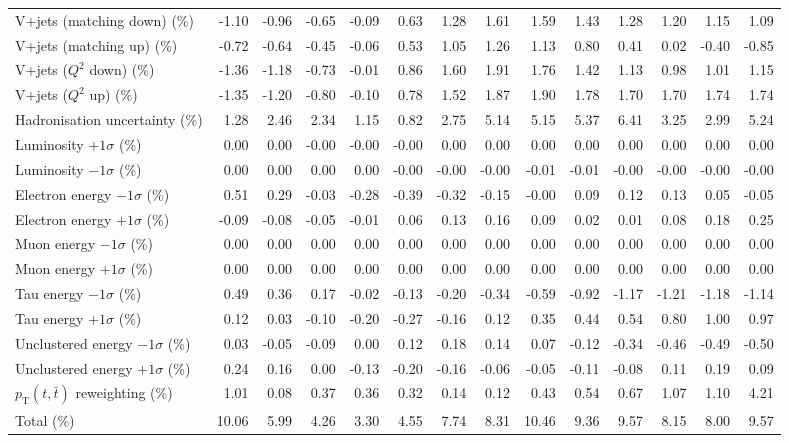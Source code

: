 \begin{table}[htbp]
{\begin{tabular}{lrrrrrrrrrrrrr}
V+jets (matching down) (\%) & -1.10 & -0.96 & -0.65 & -0.09 & 0.63 & 1.28 & 1.61 & 1.59 & 1.43 & 1.28 & 1.20 & 1.15 & 1.09 \\ 
V+jets (matching up) (\%) & -0.72 & -0.64 & -0.45 & -0.06 & 0.53 & 1.05 & 1.26 & 1.13 & 0.80 & 0.41 & 0.02 & -0.40 & -0.85 \\ 
V+jets ($Q^{2}$ down) (\%) & -1.36 & -1.18 & -0.73 & -0.01 & 0.86 & 1.60 & 1.91 & 1.76 & 1.42 & 1.13 & 0.98 & 1.01 & 1.15 \\ 
V+jets ($Q^{2}$ up) (\%) & -1.35 & -1.20 & -0.80 & -0.10 & 0.78 & 1.52 & 1.87 & 1.90 & 1.78 & 1.70 & 1.70 & 1.74 & 1.74 \\ 
Hadronisation uncertainty (\%) & 1.28 & 2.46 & 2.34 & 1.15 & 0.82 & 2.75 & 5.14 & 5.15 & 5.37 & 6.41 & 3.25 & 2.99 & 5.24 \\ 
Luminosity $+1\sigma$ (\%) & 0.00 & 0.00 & -0.00 & -0.00 & -0.00 & 0.00 & 0.00 & 0.00 & 0.00 & 0.00 & 0.00 & 0.00 & 0.00 \\ 
Luminosity $-1\sigma$ (\%) & 0.00 & 0.00 & 0.00 & 0.00 & -0.00 & -0.00 & -0.00 & -0.01 & -0.01 & -0.00 & -0.00 & -0.00 & -0.00 \\ 
Electron energy $-1\sigma$ (\%) & 0.51 & 0.29 & -0.03 & -0.28 & -0.39 & -0.32 & -0.15 & -0.00 & 0.09 & 0.12 & 0.13 & 0.05 & -0.05 \\ 
Electron energy $+1\sigma$ (\%) & -0.09 & -0.08 & -0.05 & -0.01 & 0.06 & 0.13 & 0.16 & 0.09 & 0.02 & 0.01 & 0.08 & 0.18 & 0.25 \\ 
Muon energy $-1\sigma$ (\%) & 0.00 & 0.00 & 0.00 & 0.00 & 0.00 & 0.00 & 0.00 & 0.00 & 0.00 & 0.00 & 0.00 & 0.00 & 0.00 \\ 
Muon energy $+1\sigma$ (\%) & 0.00 & 0.00 & 0.00 & 0.00 & 0.00 & 0.00 & 0.00 & 0.00 & 0.00 & 0.00 & 0.00 & 0.00 & 0.00 \\ 
Tau energy $-1\sigma$ (\%) & 0.49 & 0.36 & 0.17 & -0.02 & -0.13 & -0.20 & -0.34 & -0.59 & -0.92 & -1.17 & -1.21 & -1.18 & -1.14 \\ 
Tau energy $+1\sigma$ (\%) & 0.12 & 0.03 & -0.10 & -0.20 & -0.27 & -0.16 & 0.12 & 0.35 & 0.44 & 0.54 & 0.80 & 1.00 & 0.97 \\ 
Unclustered energy $-1\sigma$ (\%) & 0.03 & -0.05 & -0.09 & 0.00 & 0.12 & 0.18 & 0.14 & 0.07 & -0.12 & -0.34 & -0.46 & -0.49 & -0.50 \\ 
Unclustered energy $+1\sigma$ (\%) & 0.24 & 0.16 & 0.00 & -0.13 & -0.20 & -0.16 & -0.06 & -0.05 & -0.11 & -0.08 & 0.11 & 0.19 & 0.09 \\ 
$p_\mathrm{T}(t,\bar{t})$ reweighting (\%) & 1.01 & 0.08 & 0.37 & 0.36 & 0.32 & 0.14 & 0.12 & 0.43 & 0.54 & 0.67 & 1.07 & 1.10 & 4.21 \\ 
\hline 
Total (\%) & 10.06  & 5.99  & 4.26  & 3.30  & 4.55  & 7.74  & 8.31  & 10.46  & 9.36  & 9.57  & 8.15  & 8.00  & 9.57 \\ 
\hline 
\end{tabular}
}
\end{table}
